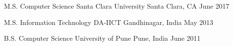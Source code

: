 

\begin{cventries}

  \cventry
    {M.S. Computer Science} %
    {Santa Clara University} %
    {Santa Clara, CA} %
    {June 2017} %
    {}

  \cventry
    {M.S. Information Technology} %
    {DA-IICT} %
    {Gandhinagar, India} %
    {May 2013} %
    {}

  \cventry
    {B.S. Computer Science} %
    {University of Pune} %
    {Pune, India} %
    {June 2011} %
    {}

\end{cventries}
